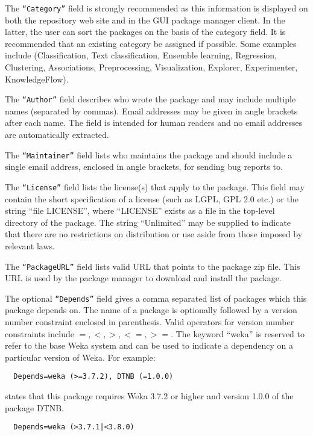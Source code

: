 The \texttt{``Category''} field is strongly recommended as this
information is displayed on both the repository web site and in the
GUI package manager client. In the latter, the user can sort the
packages on the basis of the category field. It is recommended that an
existing category be assigned if possible. Some examples include
(Classification, Text classification, Ensemble learning, Regression,
Clustering, Associations, Preprocessing, Visualization, Explorer,
Experimenter, KnowledgeFlow).

The \texttt{``Author''} field describes who wrote the package and may
include multiple names (separated by commas). Email addresses may be
given in angle brackets after each name. The field is intended for
human readers and no email addresses are automatically extracted.

The \texttt{``Maintainer''} field lists who maintains the package and
should include a single email address, enclosed in angle brackets, for
sending bug reports to.

The \texttt{``License''} field lists the license(s) that apply to the
package. This field may contain the short specification of a license
(such as LGPL, GPL 2.0 etc.) or the string ``file LICENSE'', where
``LICENSE'' exists as a file in the top-level directory of the
package. The string ``Unlimited'' may be supplied to indicate that
there are no restrictions on distribution or use aside from those
imposed by relevant laws.

The \texttt{``PackageURL''} field lists valid URL that points to the
package zip file. This URL is used by the package manager to download
and install the package.

The optional \texttt{``Depends''} field gives a comma separated list
of packages which this package depends on. The name of a package is
optionally followed by a version number constraint enclosed in
parenthesis. Valid operators for version number constraints include
$=, <, >, <=, >=$. The keyword ``weka'' is reserved to refer to the
base Weka system and can be used to indicate a dependency on a 
particular version of Weka. For example:

\begin{verbatim}
  Depends=weka (>=3.7.2), DTNB (=1.0.0)
\end{verbatim}

states that this package requires Weka 3.7.2 or higher and version
1.0.0 of the package DTNB.

\begin{verbatim}
  Depends=weka (>3.7.1|<3.8.0)
\end{verbatim}

